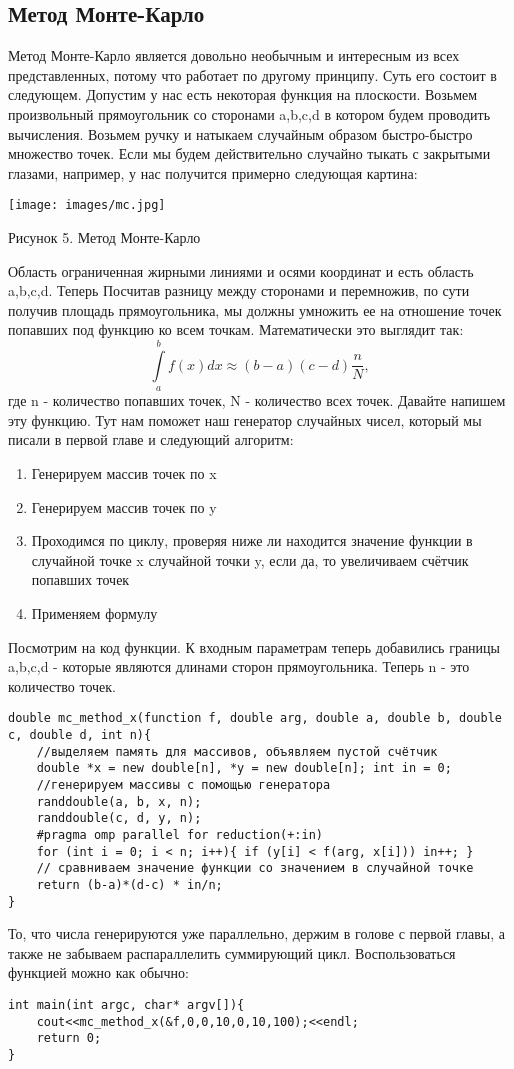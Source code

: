 \documentclass{article}
\begin{document}
\subsection{Метод Монте-Карло}
Метод Монте-Карло является довольно необычным и интересным из всех представленных, потому что работает по другому принципу. Суть его состоит в следующем. Допустим у нас есть некоторая функция на плоскости. Возьмем произвольный прямоугольник со сторонами a,b,c,d в котором будем проводить вычисления. Возьмем ручку и натыкаем случайным образом быстро-быстро множество точек. Если мы будем действительно случайно тыкать с закрытыми глазами, например, у нас получится примерно следующая картина:
\begin{center}
    \texttt{[image: images/mc.jpg]}
    
    Рисунок 5. Метод Монте-Карло
\end{center}
Область ограниченная жирными линиями и осями координат и есть область a,b,c,d.
Теперь Посчитав разницу между сторонами и перемножив, по сути получив площадь прямоугольника, мы должны умножить ее на отношение точек попавших под функцию ко всем точкам. Математически это выглядит так:
$$\int\limits_a^b f(x)dx \approx (b-a)(c-d)\frac{n}{N},$$
где n - количество попавших точек, N - количество всех точек. 
Давайте напишем эту функцию. Тут нам поможет наш генератор случайных чисел, который мы писали в первой главе и следующий алгоритм:
\begin{enumerate}
    \item Генерируем массив точек по x
    \item Генерируем массив точек по y
    \item Проходимся по циклу, проверяя ниже ли находится значение функции в случайной точке x случайной точки y, если да, то увеличиваем счётчик попавших точек
    \item Применяем формулу
\end{enumerate}
Посмотрим на код функции. К входным параметрам теперь добавились границы a,b,c,d - которые являются длинами сторон прямоугольника. Теперь n - это количество точек.
\begin{lstlisting}
double mc_method_x(function f, double arg, double a, double b, double c, double d, int n){
    //выделяем память для массивов, объявляем пустой счётчик
    double *x = new double[n], *y = new double[n]; int in = 0;
    //генерируем массивы с помощью генератора
    randdouble(a, b, x, n);
    randdouble(c, d, y, n);
    #pragma omp parallel for reduction(+:in)
    for (int i = 0; i < n; i++){ if (y[i] < f(arg, x[i])) in++; }
    // сравниваем значение функции со значением в случайной точке
    return (b-a)*(d-c) * in/n;
}
\end{lstlisting}
То, что числа генерируются уже параллельно, держим в голове с первой главы, а также не забываем распараллелить суммирующий цикл.
Воспользоваться функцией можно как обычно:
\begin{lstlisting}
int main(int argc, char* argv[]){
    cout<<mc_method_x(&f,0,0,10,0,10,100);<<endl;
    return 0;
}
\end{lstlisting}
\end{document}

